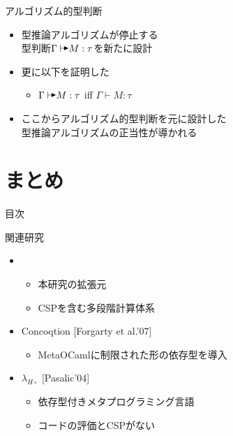 \documentclass[dvipdfmx,aspectratio=169, 20pt]{beamer}
\begin{document}
\begin{frame}[fragile]{アルゴリズム的型判断}
    \begin{itemize}
    \item 型推論アルゴリズムが停止する\\
        型判断\( \Gamma \AV M : \tau \)を新たに設計
    \item 更に以下を証明した
    \begin{itemize}
            \item \( \Gamma \AV M : \tau \) iff \( \Gamma \vdash M : \tau \)
    \end{itemize}

    \item ここからアルゴリズム的型判断を元に設計した\\型推論アルゴリズムの正当性が導かれる
    \end{itemize}
\end{frame}

\section{まとめ}

\begin{frame}{目次}
    \tableofcontents[currentsection]
\end{frame}


\begin{frame}[fragile]{関連研究}
    \begin{itemize}
        \item {}
            \begin{itemize}
                    \item 本研究の拡張元
                    \item CSPを含む多段階計算体系
            \end{itemize}
        \item Concoqtion [Forgarty et al.'07]
            \begin{itemize}
                \item MetaOCamlに制限された形の依存型を導入
            \end{itemize}
        \item \( \lambda_{H\circ} \) [Pasalic'04]
            \begin{itemize}
                \item 依存型付きメタプログラミング言語
                \item コードの評価とCSPがない
            \end{itemize}
    \end{itemize}
\end{frame}
\end{document}
